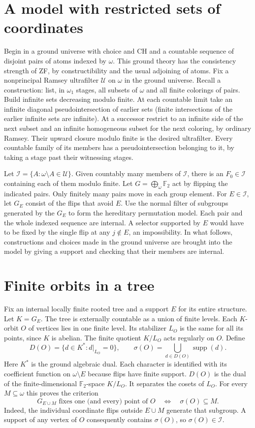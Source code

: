 \documentclass[11pt]{article}
\newcommand{\II}{\mathcal I}
\newcommand{\UU}{\mathcal U}
\newcommand{\FF}{\mathbb F_2}
\newcommand{\supp}{\operatorname{supp}}
\begin{document}
\section{A model with restricted sets of coordinates}
Begin in a ground universe with choice and CH and a countable sequence of disjoint pairs of atoms indexed by $\omega$. This ground theory has the consistency strength of ZF, by constructibility and the usual adjoining of atoms. Fix a nonprincipal Ramsey ultrafilter $\UU$ on $\omega$ in the ground universe. Recall a construction: list, in $\omega_1$ stages, all subsets of $\omega$ and all finite colorings of pairs. Build infinite sets decreasing modulo finite. At each countable limit take an infinite diagonal pseudointersection of earlier sets (finite intersections of the earlier infinite sets are infinite). At a successor restrict to an infinite side of the next subset and an infinite homogeneous subset for the next coloring, by ordinary Ramsey. Their upward closure modulo finite is the desired ultrafilter. Every countable family of its members has a pseudointersection belonging to it, by taking a stage past their witnessing stages.

Let $\II=\{A:\omega\setminus A\in\UU\}$. Given countably many members of $\II$, there is an $F_0\in\II$ containing each of them modulo finite. Let $G=\bigoplus_\omega\FF$ act by flipping the indicated pairs. Only finitely many pairs move in each group element. For $E\in\II$, let $G_E$ consist of the flips that avoid $E$. Use the normal filter of subgroups generated by the $G_E$ to form the hereditary permutation model. Each pair and the whole indexed sequence are internal. A selector supported by $E$ would have to be fixed by the single flip at any $j\notin E$, an impossibility. In what follows, constructions and choices made in the ground universe are brought into the model by giving a support and checking that their members are internal.

\section{Finite orbits in a tree}
Fix an internal locally finite rooted tree and a support $E$ for its entire structure. Let $K=G_E$. The tree is externally countable as a union of finite levels. Each $K$-orbit $O$ of vertices lies in one finite level. Its stabilizer $L_O$ is the same for all its points, since $K$ is abelian. The finite quotient $K/L_O$ acts regularly on $O$. Define
\[
 D(O)=\{d\in K^*:d|_{L_O}=0\},\qquad
 \sigma(O)=\bigcup_{d\in D(O)}\supp(d).
\]
Here $K^*$ is the ground algebraic dual. Each character is identified with its coefficient function on $\omega\setminus E$ because flips have finite support. $D(O)$ is the dual of the finite-dimensional $\FF$-space $K/L_O$. It separates the cosets of $L_O$. For every $M\subseteq\omega$ this proves the criterion
\begin{equation}\label{criterion}
 G_{E\cup M}\text{ fixes one (and every) point of }O
 \quad\Longleftrightarrow\quad \sigma(O)\subseteq M .
\end{equation}
Indeed, the individual coordinate flips outside $E\cup M$ generate that subgroup. A support of any vertex of $O$ consequently contains $\sigma(O)$, so $\sigma(O)\in\II$.
\end{document}
